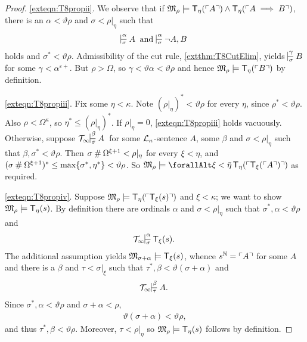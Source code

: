 \documentclass[UKenglish,cleveref,DIV=12]{scrartcl}
\let\forall\forallAlt
\theoremstyle{definition}
\theoremstyle{definition}
\begin{document}
\begin{proof}

\ref{exteqn:T8propii}. We observe that if $\mathfrak M_\rho\models
\mathsf{T}_\eta(\ulcorner{A}\urcorner)\land\mathsf{T}_\eta(\ulcorner{A\implies B}\urcorner)$, there is an
$\alpha<\vartheta\rho$ and $\sigma<\rho|_\eta$ such that
\begin{align*}
 \prov{\alpha}\sigma{A}\text{ and }\prov{\alpha}\sigma{\lnot A,B}
\end{align*}
holds and $\sigma^*<\vartheta\rho$. Admissibility of the cut rule, \cref{extthm:T8CutElim}, yields
$\prov{\gamma}\sigma{B}$ for some $\gamma<\alpha^{\varepsilon+}$. But $\rho>\Omega$, so $\gamma<\vartheta\alpha<\vartheta\rho$ and hence $\mathfrak M_\rho\models \mathsf{T}_\eta(\ulcorner{B}\urcorner)$ by definition.

\ref{exteqn:T8propiii}. Fix some $\eta<\kappa$. Note $(\rho|_\eta)^*<\vartheta\rho$ for every $\eta$, since $\rho^*<\vartheta\rho$. Also $\rho<\Omega^\kappa$, so $\eta^*\le(\rho|_\eta)^*$. If $\rho|_\eta=0$,
\ref{exteqn:T8propiii} holds vacuously. Otherwise, suppose $\Tinfty\prov\beta\sigma A$ for some $\mathcal{L}_\kappa$-sentence $A$, some $\beta$ and $\sigma<\rho|_\eta$ such that $\beta,\sigma^*<\vartheta\rho$. Then $\sigma\mathbin{\#}\Omega^{\xi+1}<\rho|_\eta$ for every $\xi<\eta$, and $(\sigma\mathbin{\#}\Omega^{\xi+1})^*\le\max\{\sigma^*,\eta^*\}<\vartheta\rho$. So $\mathfrak M_\rho\models\forall\xi<\bar\eta\,\T_\eta(\gn{\T_\xi(\gn A)})$ as required.

\ref{exteqn:T8propiv}. Suppose $ \mathfrak M_\rho\models \mathsf{T}_\eta(\ulcorner{\mathsf{T}_\xi(s)}\urcorner)$ and $\xi<\kappa$; we want to show $\mathfrak M_\rho\models \mathsf{T}_\eta(s)$. By definition there are ordinals $\alpha$ and $\sigma<\rho|_\eta$ such that $\sigma^*,\alpha<\vartheta\rho$ and
\begin{align*}%
 \Tinfty\prov{\alpha}{\sigma}{\T_\xi(s).}
\end{align*}
The additional assumption yields $\mathfrak{M}_{\sigma+\alpha}\models \mathsf{T}_\xi(s)$, whence $s^\mathbb N=\ulcorner{A}\urcorner$ for some $A$ and there is a $\beta$ and $\tau<\sigma|_\xi$ such that $\tau^*,\beta<\vartheta(\sigma+\alpha)$ and
\begin{align*}
  \Tinfty\prov\beta\tau {A.}
\end{align*}
Since $\sigma^*,\alpha<\vartheta\rho$ and $\sigma+\alpha<\rho$,
\begin{align*}
  \vartheta(\sigma+\alpha)< \vartheta\rho,
\end{align*}
and thus $\tau^*,\beta<\vartheta\rho$. Moreover, $\tau<\rho|_\eta$ so
$\mathfrak M_\rho\models \mathsf{T}_\eta(s)$ follows by definition.


\end{proof}
\end{document}
